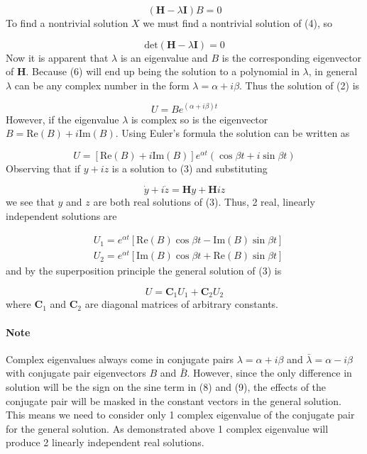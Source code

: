 \documentclass{article}
\begin{document}
				\begin{equation}
					 (\textbf{H} -\lambda\textbf{I})B= 0
				\end{equation}
To find a nontrivial solution $X$ we must find a nontrivial solution of (4), so

				\begin{equation}
					\text{det}(\textbf{H} - \lambda \textbf{I}) = 0
				\end{equation}
Now it is apparent that $\lambda$ is an eigenvalue and $B$ is the corresponding eigenvector of \textbf{H}. Because (6) will end up being the solution to a polynomial in $\lambda$, in general $\lambda$ can be any complex number in the form $\lambda = \alpha + i\beta$. Thus the solution of (2) is 

				\begin{equation}
					U = Be^{(\alpha + i\beta)t}
				\end{equation}
However, if the eigenvalue $\lambda$ is complex so is the eigenvector $B = \text{Re}(B) + i\text{Im}(B) $. Using Euler's formula the solution can be written as 

				\begin{equation*}
					U = [\text{Re}(B) + i\text{Im}(B)]e^{\alpha t}(\cos{\beta t}+ i\sin{\beta t})
				\end{equation*}
Observing that if $y + iz$ is a solution to (3) and substituting

				\begin{equation*}
					\dot{y} + i\dot{z} = \textbf{H}y + \textbf{H}iz
				\end{equation*}
we see that $y$ and $z$ are both real solutions of (3). Thus, 2 real, linearly independent solutions are 

				\begin{align}
					&U_1 = e^{\alpha t}\left[\text{Re}(B)\cos{\beta t} -\text{Im}(B)\sin{\beta t}\right]\\
					&U_2 = e^{\alpha t}\left[\text{Im}(B)\cos{\beta t} +\text{Re}(B)\sin{\beta t} \right]
				\end{align}
and by the superposition principle the general solution of (3) is

				\begin{equation*}
					U = \textbf{C}_1U_1 + \textbf{C}_2U_2
				\end{equation*}
where $\textbf{C}_1$ and $\textbf{C}_2$ are diagonal matrices of arbitrary constants.
			\paragraph{Note} Complex eigenvalues always come in conjugate pairs $\lambda = \alpha + i\beta$ and $\bar{\lambda}= \alpha - i\beta$ with conjugate pair eigenvectors $B$ and $\bar{B}$. However, since the only difference in solution will be the sign on the sine term in (8) and (9), the effects of the conjugate pair will be masked in the constant vectors in the general solution. This means we need to consider only 1 complex eigenvalue of the conjugate pair for the general solution. As demonstrated above 1 complex eigenvalue will produce 2 linearly independent real solutions.
\end{document}
